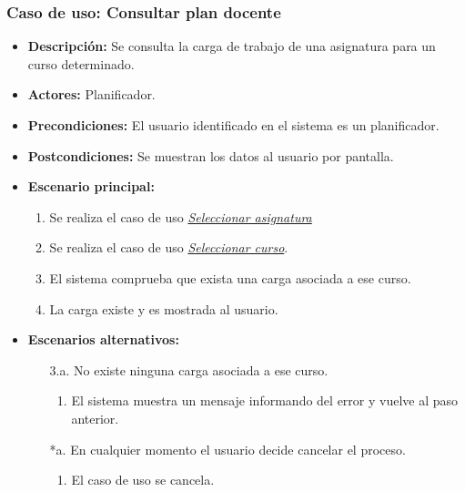 \subsubsection*{Caso de uso: Consultar plan docente}
\begin{itemize}
\item{\bf Descripción:} Se consulta la carga de trabajo de una asignatura para un curso determinado.
\item{\bf Actores:} Planificador.
\item{\bf Precondiciones:} El usuario identificado en el sistema es un planificador.
\item{\bf Postcondiciones:} Se muestran los datos al usuario por pantalla.
\item{\bf Escenario principal:}
	\begin{enumerate}
	\item Se realiza el caso de uso {\em \hyperref[select_asignatura]{Seleccionar asignatura}}
	\item Se realiza el caso de uso {\em \hyperref[select_curso]{Seleccionar curso}}.
	\item El sistema comprueba que exista una carga asociada a ese curso.
	\item La carga existe y es mostrada al usuario.
	\end{enumerate}
\item{\bf Escenarios alternativos:}
	\begin{itemize}
	\item[3.a.]No existe ninguna carga asociada a ese curso.
		\begin{enumerate}
		\item El sistema muestra un mensaje informando del error y vuelve al paso anterior.
		\end{enumerate}
	\item[*a.]En cualquier momento el usuario decide cancelar el proceso.
		\begin{enumerate}
		\item El caso de uso se cancela.
		\end{enumerate}		
	\end{itemize}
\end{itemize}




